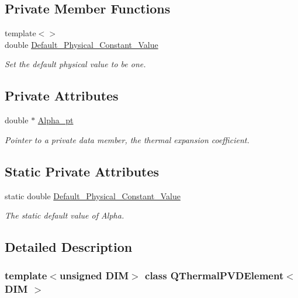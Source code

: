 \subsection*{Private Member Functions}
\begin{DoxyCompactItemize}
\item 
{\footnotesize template$<$$>$ }\\double \hyperlink{classQThermalPVDElement_a1c0b33534256a66daf988a8fbb8d8cde}{Default\+\_\+\+Physical\+\_\+\+Constant\+\_\+\+Value}
\begin{DoxyCompactList}\small\item\em Set the default physical value to be one. \end{DoxyCompactList}\end{DoxyCompactItemize}
\subsection*{Private Attributes}
\begin{DoxyCompactItemize}
\item 
double $\ast$ \hyperlink{classQThermalPVDElement_a97267a52ceec2a2153b23e18e2a2c631}{Alpha\+\_\+pt}
\begin{DoxyCompactList}\small\item\em Pointer to a private data member, the thermal expansion coefficient. \end{DoxyCompactList}\end{DoxyCompactItemize}
\subsection*{Static Private Attributes}
\begin{DoxyCompactItemize}
\item 
static double \hyperlink{classQThermalPVDElement_ad0722326e8c25746f63b35a46cac5886}{Default\+\_\+\+Physical\+\_\+\+Constant\+\_\+\+Value}
\begin{DoxyCompactList}\small\item\em The static default value of Alpha. \end{DoxyCompactList}\end{DoxyCompactItemize}


\subsection{Detailed Description}
\subsubsection*{template$<$unsigned D\+IM$>$\newline
class Q\+Thermal\+P\+V\+D\+Element$<$ D\+I\+M $>$}

